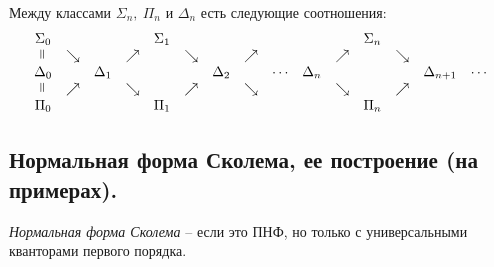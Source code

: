 \begin{theorem}
    Между классами $ \Sigma_n, \ \Pi_n $ и $ \Delta_n $ есть следующие соотношения:
    \[
        \begin{array}{ccccccccccccccc}
            \Sigma_0 &          &          &          & \Sigma_1 &          &          &          &        &          &          & \Sigma_n &          &              &        \\
            \verteq  & \searrow &          & \nearrow &          & \searrow &          & \nearrow &        &          & \nearrow &          & \searrow &              &        \\
            \Delta_0 &          & \Delta_1 &          &          &          & \Delta_2 &          & \cdots & \Delta_n &          &          &          & \Delta_{n+1} & \cdots \\
            \verteq  & \nearrow &          & \searrow &          & \nearrow &          & \searrow &        &          & \searrow &          & \nearrow &              &        \\
            \Pi_0    &          &          &          & \Pi_1    &          &          &          &        &          &          & \Pi_n    &          &              &
        \end{array}
    \]
\end{theorem}

\subsection{Нормальная форма Сколема, ее построение (на примерах).}

\begin{definition}
    \emph{Нормальная форма Сколема} -- если это ПНФ, но только с универсальными кванторами первого порядка.
\end{definition}


